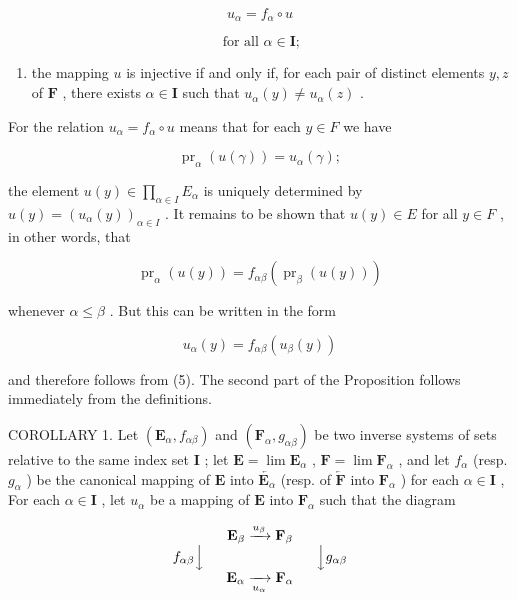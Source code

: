 \[
u _ {\alpha} = f _ {\alpha} \circ u\tag{6}
\]

\[
\text { for   all } \alpha \in \mathbf {I};
\]

\begin{enumerate}
\def\labelenumi{(\alph{enumi})}
\setcounter{enumi}{1}
\tightlist
\item
  the mapping \(u\) is injective if and only if, for each pair of distinct elements \(y, z\) of \(\mathbf{F}\) , there exists \(\alpha \in \mathbf{I}\) such that \(u_{\alpha}(y) \neq u_{\alpha}(z)\) .
\end{enumerate}

For the relation \(u_{\alpha} = f_{\alpha} \circ u\) means that for each \(y \in F\) we have

\[
\operatorname{pr} _ {\alpha} (u (\gamma)) = u _ {\alpha} (\gamma);
\]

the element \(u(y) \in \prod_{\alpha \in I} E_{\alpha}\) is uniquely determined by \(u(y) = (u_{\alpha}(y))_{\alpha \in I}\) . It remains to be shown that \(u(y) \in E\) for all \(y \in F\) , in other words, that

\[
\operatorname{pr} _ {\alpha} (u (y)) = f _ {\alpha \beta} (\operatorname{pr} _ {\beta} (u (y)))
\]

whenever \(\alpha \leqslant \beta\) . But this can be written in the form

\[
u _ {\alpha} (y) = f _ {\alpha \beta} (u _ {\beta} (y))
\]

and therefore follows from (5). The second part of the Proposition follows immediately from the definitions.

COROLLARY 1. Let \((\mathbf{E}_{\alpha}, f_{\alpha \beta})\) and \((\mathbf{F}_{\alpha}, g_{\alpha \beta})\) be two inverse systems of sets relative to the same index set \(\mathbf{I}\) ; let \(\mathbf{E} = \lim \mathbf{E}_{\alpha}\) , \(\mathbf{F} = \lim \mathbf{F}_{\alpha}\) , and let \(f_{\alpha}\) (resp. \(g_{\alpha}\) ) be the canonical mapping of \(\mathbf{E}\) into \(\overleftarrow{\mathbf{E}_{\alpha}}\) (resp. of \(\overleftarrow{\mathbf{F}}\) into \(\mathbf{F}_{\alpha}\) ) for each \(\alpha \in \mathbf{I}\) , For each \(\alpha \in \mathbf{I}\) , let \(u_{\alpha}\) be a mapping of \(\mathbf{E}\) into \(\mathbf{F}_{\alpha}\) such that the diagram

\[
\begin{array}{c} \mathbf {E} _ {\beta} \xrightarrow {u _ {\beta}} \mathbf {F} _ {\beta} \\ f _ {\alpha \beta} \Big \downarrow \qquad \qquad \qquad \qquad \Big \downarrow g _ {\alpha \beta} \\ \mathbf {E} _ {\alpha} \xrightarrow [ u _ {\alpha} ]{} \mathbf {F} _ {\alpha} \end{array}
\]

